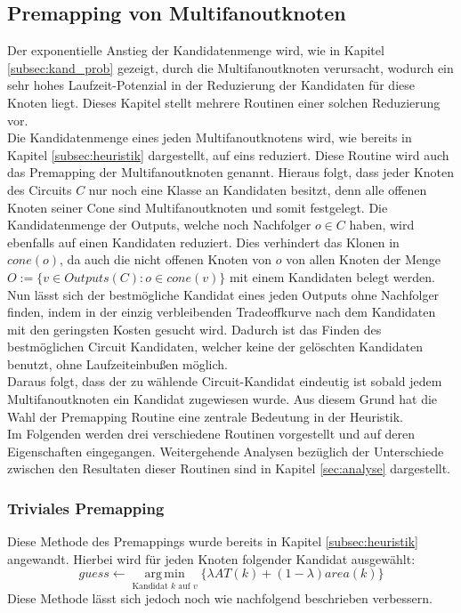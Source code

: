 \documentclass[11pt, a4paper, german]{article}
\DeclareMathOperator*{\argmin}{arg\,min}
\begin{document}
 \subsection{Premapping von Multifanoutknoten}
 \label{sec:premapping}
Der exponentielle Anstieg der Kandidatenmenge wird, wie in Kapitel \ref{subsec:kand_prob} gezeigt, durch die Multifanoutknoten verursacht, wodurch  ein sehr hohes Laufzeit-Potenzial in der Reduzierung der Kandidaten für diese Knoten liegt. Dieses Kapitel stellt mehrere Routinen einer solchen Reduzierung vor.\\

 Die Kandidatenmenge eines jeden Multifanoutknotens wird, wie bereits in Kapitel \ref{subsec:heuristik} dargestellt, auf eins reduziert. Diese Routine wird auch das Premapping der Multifanoutknoten genannt. Hieraus folgt, dass jeder Knoten des Circuits $C$ nur noch eine Klasse an Kandidaten besitzt, denn alle offenen Knoten seiner Cone sind Multifanoutknoten und somit festgelegt.  Die Kandidatenmenge der Outputs, welche noch Nachfolger $o \in C$ haben, wird ebenfalls auf einen Kandidaten reduziert. Dies verhindert das Klonen in $cone(o)$, da  auch die nicht offenen Knoten von $o$ von allen Knoten der Menge $O := \{ v \in Outputs(C): o \in cone(v) \}$ mit einem Kandidaten belegt werden.\\
Nun lässt sich der bestmögliche Kandidat eines jeden Outputs ohne Nachfolger finden, indem in der einzig verbleibenden Tradeoffkurve nach dem Kandidaten mit den geringsten Kosten gesucht wird. Dadurch ist das Finden des  bestmöglichen Circuit Kandidaten,  welcher keine der gelöschten Kandidaten benutzt, ohne Laufzeiteinbußen möglich. \\
Daraus folgt, dass der zu wählende Circuit-Kandidat eindeutig ist sobald jedem Multifanoutknoten ein Kandidat zugewiesen wurde. Aus diesem Grund hat die Wahl der Premapping Routine eine zentrale Bedeutung in der Heuristik.\\

Im Folgenden werden drei verschiedene Routinen vorgestellt und auf deren Eigenschaften eingegangen. Weitergehende Analysen bezüglich der Unterschiede zwischen den Resultaten dieser Routinen sind in Kapitel \ref{sec:analyse} dargestellt.

\subsubsection{Triviales Premapping}
\label{subsec:triviales_premapping}
Diese Methode des Premappings wurde bereits in Kapitel \ref{subsec:heuristik} angewandt. Hierbei wird für jeden Knoten folgender Kandidat ausgewählt: \[ guess \gets \argmin\limits_{\text{Kandidat }k\text{ auf }v}\{ \lambda AT(k) + (1-\lambda) area(k)  \} \]
Diese Methode lässt sich jedoch noch wie nachfolgend beschrieben verbessern.\\
\end{document}
